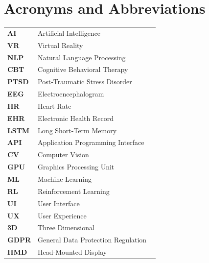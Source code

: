 \chapter*{Acronyms and Abbreviations}

\begin{flushleft}
\renewcommand{\arraystretch}{1.5}
\begin{tabular}{l p{0.8\linewidth}}
\textbf{AI} & Artificial Intelligence \\
\textbf{VR} & Virtual Reality \\
\textbf{NLP} & Natural Language Processing \\
\textbf{CBT} & Cognitive Behavioral Therapy \\
\textbf{PTSD} & Post-Traumatic Stress Disorder \\
\textbf{EEG} & Electroencephalogram \\
\textbf{HR} & Heart Rate \\
\textbf{EHR} & Electronic Health Record \\
\textbf{LSTM} & Long Short-Term Memory \\
\textbf{API} & Application Programming Interface \\
\textbf{CV} & Computer Vision \\
\textbf{GPU} & Graphics Processing Unit \\
\textbf{ML} & Machine Learning \\
\textbf{RL} & Reinforcement Learning \\
\textbf{UI} & User Interface \\
\textbf{UX} & User Experience \\
\textbf{3D} & Three Dimensional \\
\textbf{GDPR} & General Data Protection Regulation \\
\textbf{HMD} & Head-Mounted Display \\
\end{tabular}
\end{flushleft}
